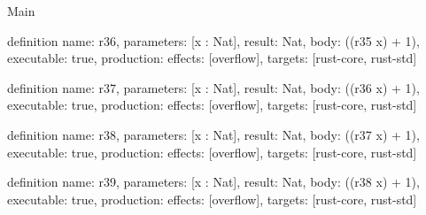 \begin{lexlean}{Main}
\begin{semanticmodule}
definition{
  name: r36,
  parameters: [x : Nat],
  result: Nat,
  body: ((r35 x) + 1),
  executable: true,
  production: {effects: [overflow], targets: [rust-core, rust-std]}
}

definition{
  name: r37,
  parameters: [x : Nat],
  result: Nat,
  body: ((r36 x) + 1),
  executable: true,
  production: {effects: [overflow], targets: [rust-core, rust-std]}
}

definition{
  name: r38,
  parameters: [x : Nat],
  result: Nat,
  body: ((r37 x) + 1),
  executable: true,
  production: {effects: [overflow], targets: [rust-core, rust-std]}
}

definition{
  name: r39,
  parameters: [x : Nat],
  result: Nat,
  body: ((r38 x) + 1),
  executable: true,
  production: {effects: [overflow], targets: [rust-core, rust-std]}
}
\end{semanticmodule}
\end{lexlean}
